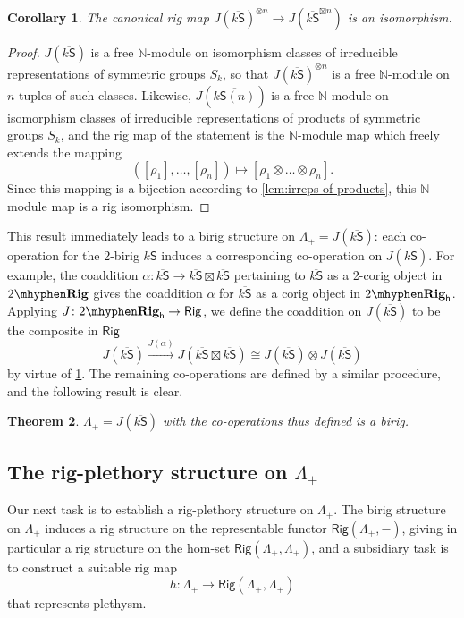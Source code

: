 \documentclass[12pt,reqno]{amsart}
\theoremstyle{plain}
\newtheorem{thm}{Theorem}
\newtheorem{cor}[thm]{Corollary}
\theoremstyle{definition}
\theoremstyle{remark}
\newcommand{\maps}{\colon}
\newcommand{\category}[1]{\mathsf{#1}}
\newcommand{\N}{\mathbb N}
\renewcommand{\S}{\category S}
\newcommand{\namedcat}[1]{\mathsf{#1}}
\newcommand{\Rig}{\namedcat{Rig}}
\newcommand{\TRig}{2\mhyphen\namedbicat{Rig}}
\newcommand{\namedbicat}[1]{\mathbf{#1}}
\newcommand{\ho}{_\mathsf{h}}
\newcommand{\ksbar}{\overline{k\S}}
\numberwithin{thm}{section}
\begin{document}
\begin{cor}
\label{cor:J-preserves-coproducts}
The canonical rig map $J(\ksbar)^{\otimes n} \to J(\ksbar^{\boxtimes n})$ is an isomorphism. 
\end{cor}

\begin{proof}
    $J(\ksbar)$ is a free $\N$-module on isomorphism classes of irreducible representations of symmetric groups $S_k$, so that $J(\ksbar)^{\otimes n}$ is a free $\N$-module on $n$-tuples of such classes. Likewise, $J(\overline{k\S(n)})$ is a free $\N$-module on isomorphism classes of irreducible representations of products of symmetric groups $S_k$, and the rig map of the statement is the $\N$-module map which freely extends the mapping 
    \[
    ([\rho_1], \ldots, [\rho_n]) \mapsto [\rho_1 \otimes \ldots \otimes \rho_n].
    \]
    Since this mapping is a bijection according to \cref{lem:irreps-of-products}, this $\N$-module map is a rig isomorphism. 
\end{proof}

This result immediately leads to a birig structure on $\Lambda_+ = J(\ksbar)$: each co-operation for the 2-birig $\ksbar$ induces a corresponding co-operation on $J(\ksbar)$. For example, the coaddition $\alpha \maps \ksbar \to \ksbar \boxtimes \ksbar$ pertaining to $\ksbar$ as a 2-corig object in $\TRig$ gives the coaddition $\alpha$ for $\ksbar$ as a corig object in $\TRig\ho$. Applying $J \maps \TRig\ho \to \Rig$, we define the coaddition on $J(\ksbar)$ to be the composite in $\Rig$
\[
J(\ksbar) \stackrel{J(\alpha)}{\to} J(\ksbar \boxtimes \ksbar) \cong J(\ksbar) \otimes J(\ksbar)
\]
by virtue of \cref{cor:J-preserves-coproducts}. The remaining co-operations are defined by a similar procedure, and the following result is clear. 

\begin{thm}
\label{thm:lambdaplus-forms-birig}
   $\Lambda_+ = J(\ksbar)$ with the co-operations thus defined is a birig. 
\end{thm}

\subsection{The rig-plethory structure on $\Lambda_+$}

Our next task is to establish a rig-plethory structure on $\Lambda_+$. The birig structure on $\Lambda_+$ induces a rig structure on the representable functor $\Rig(\Lambda_+, -)$, giving in particular a rig structure on the hom-set $\Rig(\Lambda_+, \Lambda_+)$, and a subsidiary task is to construct a suitable rig map
\[
h \maps \Lambda_+ \to \Rig(\Lambda_+, \Lambda_+)
\]
that represents plethysm. 
\end{document}
